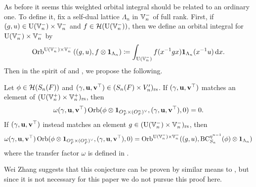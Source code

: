 As before it seems this weighted orbital integral should be related to an ordinary one.
To define it, fix a self-dual lattice $\Lambda_n$ in $\mathbb V_n^-$ of full rank.
First, if $(g,u) \in \operatorname{U}(\mathbb V_n^-) \times \mathbb V_n^-$ and $f \in \mathcal H(\operatorname{U}(\mathbb V_n^-))$,
then we define an orbital integral for $\operatorname{U}(\mathbb V_n^-) \times \mathbb V_n^-$ by
\begin{equation}
  \Orb^{\U(\VV_n^-) \times \VV_n^-}\left( (g,u), f \otimes \mathbf{1}_{\Lambda_n} \right)
  \coloneqq \int_{\U(\VV_n^-)} f(x\inv g x) \mathbf{1}_{\Lambda_n}(x^{-1} u) \odif x.
  \label{eq:unweighted_orbital_semi_lie}
\end{equation}
Then in the spirit of \cite[Conjecture 1.9]{ref:liuFJ}
and , we propose the following.
\begin{conjecture}
  \label{conj:rel_fundamental_lemma_semilie}
  Let $\phi \in \mathcal H(S_n(F))$ and ${(\gamma, \mathbf u, \mathbf v^\top)} \in (S_n(F) \times V_n')_{\mathrm{rs}}$.
  If ${(\gamma, \mathbf u, \mathbf v^\top)}$ matches an element of $(\operatorname{U}(\mathbb V_n^+) \times \mathbb V_n^+)_{\mathrm{rs}}$, then
  \[ \omega{(\gamma, \mathbf u, \mathbf v^\top)} \operatorname{Orb}(\phi \otimes \mathbf{1}_{O_F^n \times (O_F^n)^\vee}, {(\gamma, \mathbf u, \mathbf v^\top)}, 0) = 0. \]
  If ${(\gamma, \mathbf u, \mathbf v^\top)}$ instead matches an element $g \in (\operatorname{U}(\mathbb V_n^-) \times \mathbb V_n^-)_{\mathrm{rs}}$, then
  \[ \omega{(\gamma, \mathbf u, \mathbf v^\top)} \operatorname{Orb}(\phi \otimes \mathbf{1}_{O_F^n \times (O_F^n)^\vee}, {(\gamma, \mathbf u, \mathbf v^\top)}, 0)
    = \operatorname{Orb}^{\operatorname{U}(\mathbb V_n^-) \times \mathbb V_n^-}((g,u), \operatorname{BC}^{\eta^{n-1}}_{S_n}(\phi) \otimes \mathbf{1}_{\Lambda_n}) \]
  where the transfer factor $\omega$ is defined in .
\end{conjecture}
Wei Zhang suggests that this conjecture can be proven by similar means
to ,
but since it is not necessary for this paper we do not pursue this proof here.

